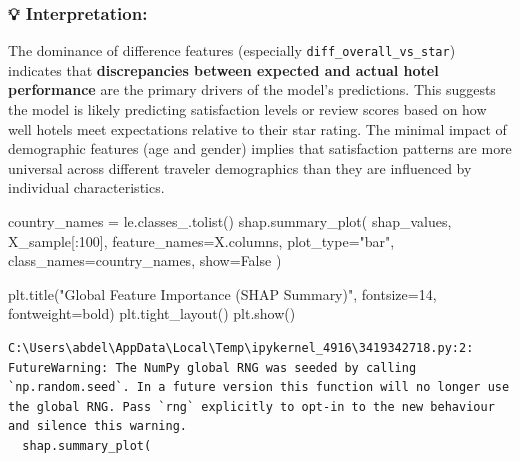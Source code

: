 \documentclass[
  letterpaper,
  DIV=11,
  numbers=noendperiod]{scrartcl}
\newenvironment{Shaded}{\begin{snugshade}}{\end{snugshade}}
\newcommand{\DecValTok}[1]{\textcolor[rgb]{0.68,0.00,0.00}{#1}}
\newcommand{\NormalTok}[1]{\textcolor[rgb]{0.00,0.23,0.31}{#1}}
\newcommand{\OperatorTok}[1]{\textcolor[rgb]{0.37,0.37,0.37}{#1}}
\newcommand{\StringTok}[1]{\textcolor[rgb]{0.13,0.47,0.30}{#1}}
\newcommand{\VariableTok}[1]{\textcolor[rgb]{0.07,0.07,0.07}{#1}}
\begin{document}
\subsubsection{💡 Interpretation:}\label{interpretation}

The dominance of difference features (especially
\texttt{diff\_overall\_vs\_star}) indicates that \textbf{discrepancies
between expected and actual hotel performance} are the primary drivers
of the model's predictions. This suggests the model is likely predicting
satisfaction levels or review scores based on how well hotels meet
expectations relative to their star rating. The minimal impact of
demographic features (age and gender) implies that satisfaction patterns
are more universal across different traveler demographics than they are
influenced by individual characteristics.

\begin{Shaded}
\begin{Highlighting}[]
\NormalTok{country\_names }\OperatorTok{=}\NormalTok{ le.classes\_.tolist()}
\NormalTok{shap.summary\_plot(}
\NormalTok{    shap\_values,}
\NormalTok{    X\_sample[:}\DecValTok{100}\NormalTok{],}
\NormalTok{    feature\_names}\OperatorTok{=}\NormalTok{X.columns,}
\NormalTok{    plot\_type}\OperatorTok{=}\StringTok{"bar"}\NormalTok{,}
\NormalTok{    class\_names}\OperatorTok{=}\NormalTok{country\_names,}
\NormalTok{    show}\OperatorTok{=}\VariableTok{False}
\NormalTok{)}

\NormalTok{plt.title(}\StringTok{"Global Feature Importance (SHAP Summary)"}\NormalTok{, fontsize}\OperatorTok{=}\DecValTok{14}\NormalTok{, fontweight}\OperatorTok{=}\StringTok{\textquotesingle{}bold\textquotesingle{}}\NormalTok{)}
\NormalTok{plt.tight\_layout()}
\NormalTok{plt.show()}
\end{Highlighting}
\end{Shaded}

\begin{verbatim}
C:\Users\abdel\AppData\Local\Temp\ipykernel_4916\3419342718.py:2: FutureWarning: The NumPy global RNG was seeded by calling `np.random.seed`. In a future version this function will no longer use the global RNG. Pass `rng` explicitly to opt-in to the new behaviour and silence this warning.
  shap.summary_plot(
\end{verbatim}
\end{document}
